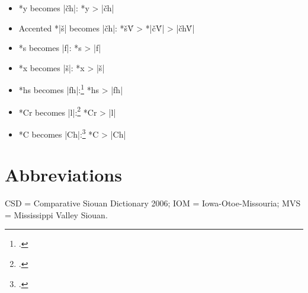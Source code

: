 \documentclass[output=paper]{LSP/langsci}
\begin{document}
\begin{itemize}
\item *y becomes |\v{c}h|: \hspace{5em} *y	>	|\v{c}h|
\item Accented *|š| becomes |\v{c}h|: \hspace{1em} *š\'V	>	*|\v{c}\'V|	>	|\v{c}h\'V|
\item *s becomes |f|: \hspace{6em} *s	>	|f|
\item *x becomes |š|: \hspace{6em} 	*x	>	|š|
\item *hs becomes |fh|:\footnote{\citealt[174, 299]{Rankinetal2006PDF}.}  \hspace{4.8em} 			*hs	>	|fh|
\item *Cr becomes |l|:\footnote{\citealt[90]{Rankinetal2006PDF}.}  \hspace{5em} 			*Cr	>	|l|
\item *C\textsuperscript{} becomes |Ch|:\footnote{\citealt[229, 232]{Rankinetal2006PDF}.}  \hspace{3.9em} *C\textsuperscript{}	>	|Ch|
\end{itemize}

\section*{Abbreviations}

CSD = Comparative Siouan Dictionary 2006; IOM = Iowa-Otoe-Missouria; MVS = Mississippi Valley Siouan.

 

\printbibliography[heading=subbibliography,notkeyword=this]
 
\end{document}
